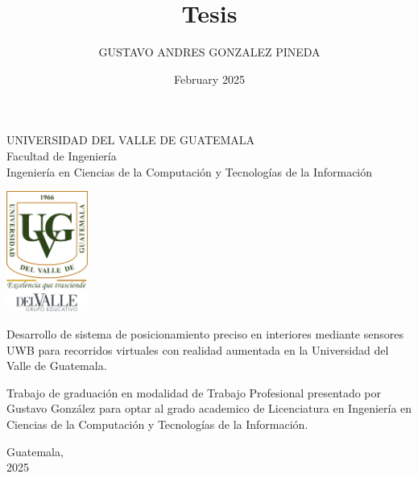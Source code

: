 \documentclass{article}
\title{Tesis}
\author{GUSTAVO ANDRES GONZALEZ PINEDA}
\date{February 2025}
\begin{document}
\begin{center}
\begin{doublespace}
    \thispagestyle{empty}  %
    \Large{UNIVERSIDAD DEL VALLE DE GUATEMALA}\\
    Facultad de Ingeniería \\
    Ingeniería en Ciencias de la Computación y Tecnologías de la Información 

    \vspace{15mm} 
    \includegraphics[width=0.2\textwidth]{images/Uvg_logo.jpg}

    \vspace{15mm} 
    {\Large Desarrollo de sistema de posicionamiento preciso en interiores mediante sensores UWB para recorridos virtuales con realidad aumentada en la Universidad del Valle de Guatemala.}

    \vspace{10mm} 
    {\Large Trabajo de graduación en modalidad de Trabajo Profesional presentado por Gustavo González
    para optar al grado academico de Licenciatura en Ingeniería en Ciencias de la Computación y Tecnologías de la Información.}

    {\Large Guatemala, \\ 2025}
    
\end{doublespace}
\end{center}

\newpage %

\thispagestyle{empty} %
\mbox{} %
\newpage %
\end{document}
